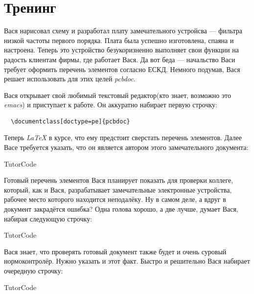 
\section{Тренинг}

Вася нарисовал схему и разработал плату замечательного устройсва --- фильтра
низкой частоты первого порядка. Плата была успешно изготовлена, спаяна и
настроена. Теперь это устройство безукоризненно выполняет свои функции на радость
клиентам фирмы, где работает Вася. Да вот беда --- начальство Васи требует
оформить перечень элементов согласно ЕСКД. Немного подумав, Вася решает
использовать для этих целей \emph{pcbdoc}.

Вася открывает свой любимый текстовый редактор(кто знает, возможно это
\emph{emacs}) и приступает к работе. Он аккуратно набирает первую строчку:

\colorbox{codecolor}{}

\begin{verbatim}
  \documentclass[doctype=pe]{pcbdoc}
\end{verbatim}

Теперь \emph{LaTeX} в курсе, что ему предстоит сверстать перечень элементов.
Далее Васе требуется указать, что он является автором этого замечательного
документа:

\begin{SaveVerbatim}{TutorCode}
\end{SaveVerbatim}
\colorbox{codecolor}{}

Готовый перечень элементов Вася планирует показать для проверки коллеге, который,
как и Вася, разрабатывает замечательные электронные устройства, рабочее место
которого находится неподалёку. Ну в самом деле, а вдруг в документ закрадётся
ошибка? Одна голова хорошо, а две лучше, думает Вася, набирая следующую
строчку:

\begin{SaveVerbatim}{TutorCode}
\end{SaveVerbatim}
\colorbox{codecolor}{}

Вася знает, что проверять готовый документ также будет и очень суровый
нормоконтролёр. Нужно указать и этот факт. Быстро и решительно Вася набирает
очередную строчку:

\begin{SaveVerbatim}{TutorCode}
\end{SaveVerbatim}
\colorbox{codecolor}{}

